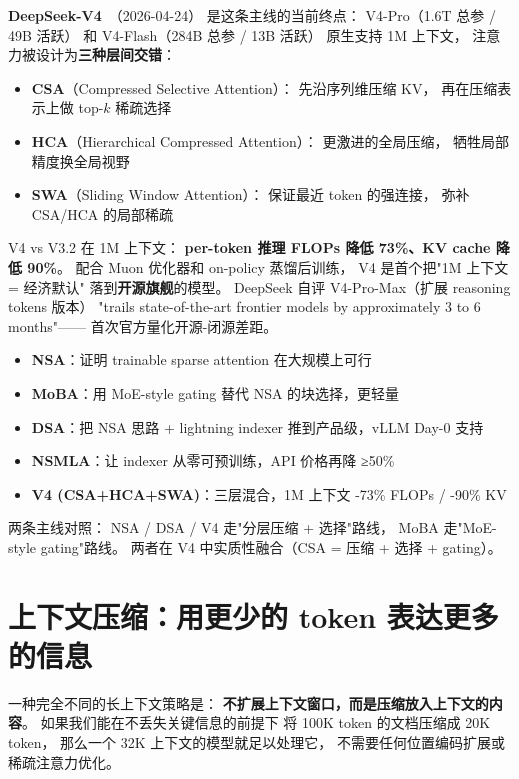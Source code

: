 \textbf{DeepSeek-V4}~\cite{deepseekv4}（2026-04-24）
是这条主线的当前终点：
V4-Pro（1.6T 总参 / 49B 活跃）
和 V4-Flash（284B 总参 / 13B 活跃）
原生支持 1M 上下文，
注意力被设计为\textbf{三种层间交错}：
\begin{itemize}[noitemsep]
  \item \textbf{CSA}（Compressed Selective Attention）：
        先沿序列维压缩 KV，
        再在压缩表示上做 top-$k$ 稀疏选择
  \item \textbf{HCA}（Hierarchical Compressed Attention）：
        更激进的全局压缩，
        牺牲局部精度换全局视野
  \item \textbf{SWA}（Sliding Window Attention）：
        保证最近 token 的强连接，
        弥补 CSA/HCA 的局部稀疏
\end{itemize}
V4 vs V3.2 在 1M 上下文：
\textbf{per-token 推理 FLOPs 降低 73\%、KV cache 降低 90\%}。
配合 Muon 优化器和 on-policy 蒸馏后训练，
V4 是首个把"1M 上下文 = 经济默认"
落到\textbf{开源旗舰}的模型。
DeepSeek 自评 V4-Pro-Max（扩展 reasoning tokens 版本）
"trails state-of-the-art frontier models by approximately 3 to 6 months"——
首次官方量化开源-闭源差距。

\begin{keybox}
\begin{itemize}[noitemsep]
  \item \textbf{NSA}：证明 trainable sparse attention 在大规模上可行
  \item \textbf{MoBA}：用 MoE-style gating 替代 NSA 的块选择，更轻量
  \item \textbf{DSA}：把 NSA 思路 + lightning indexer 推到产品级，vLLM Day-0 支持
  \item \textbf{NSMLA}：让 indexer 从零可预训练，API 价格再降 ≥50\%
  \item \textbf{V4 (CSA+HCA+SWA)}：三层混合，1M 上下文 -73\% FLOPs / -90\% KV
\end{itemize}
两条主线对照：
NSA / DSA / V4 走"分层压缩 + 选择"路线，
MoBA 走"MoE-style gating"路线。
两者在 V4 中实质性融合（CSA = 压缩 + 选择 + gating）。
\end{keybox}

\section{上下文压缩：用更少的 token 表达更多的信息}
\label{sec:context-compression}

一种完全不同的长上下文策略是：
\textbf{不扩展上下文窗口，而是压缩放入上下文的内容}。
如果我们能在不丢失关键信息的前提下
将 100K token 的文档压缩成 20K token，
那么一个 32K 上下文的模型就足以处理它，
不需要任何位置编码扩展或稀疏注意力优化。

